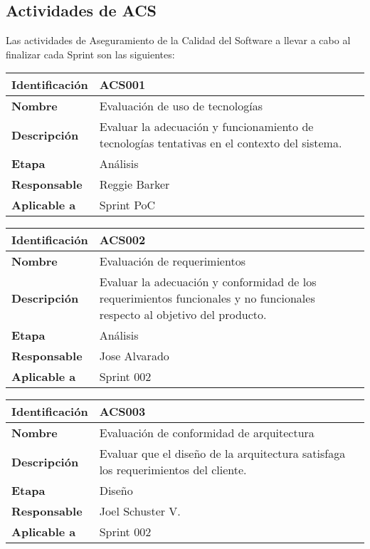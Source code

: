 \documentclass{scrreprt}
\begin{document}
\subsection{Actividades de ACS}

Las actividades de Aseguramiento de la Calidad del Software a llevar a cabo al finalizar cada Sprint son las siguientes:\\

\begin{tabular}{ |p{3cm}|p{10cm}|  }
  \hline
  \textbf{Identificación} & ACS001 \\
  \hline
  \textbf{Nombre} & Evaluación de uso de tecnologías \\
  \hline
  \textbf{Descripción} & Evaluar la adecuación y funcionamiento de tecnologías tentativas en el contexto del sistema. \\
  \hline
  \textbf{Etapa} & Análisis \\
  \hline
  \textbf{Responsable} & Reggie Barker \\
  \hline
  \textbf{Aplicable a} & Sprint PoC \\
  \hline
\end{tabular}

\vspace{0.8cm}

\begin{tabular}{ |p{3cm}|p{10cm}|  }
  \hline
  \textbf{Identificación} & ACS002 \\
  \hline
  \textbf{Nombre} & Evaluación de requerimientos \\
  \hline
  \textbf{Descripción} & Evaluar la adecuación y conformidad de los requerimientos funcionales y no funcionales respecto al objetivo del producto. \\
  \hline
  \textbf{Etapa} & Análisis \\
  \hline
  \textbf{Responsable} & Jose Alvarado \\
  \hline
  \textbf{Aplicable a} & Sprint 002 \\
  \hline
\end{tabular}

\vspace{0.8cm}

\begin{tabular}{ |p{3cm}|p{10cm}|  }
  \hline
  \textbf{Identificación} & ACS003 \\
  \hline
  \textbf{Nombre} & Evaluación de conformidad de arquitectura \\
  \hline
  \textbf{Descripción} & Evaluar que el diseño de la arquitectura satisfaga los requerimientos del cliente. \\
  \hline
  \textbf{Etapa} & Diseño \\
  \hline
  \textbf{Responsable} & Joel Schuster V. \\
  \hline
  \textbf{Aplicable a} & Sprint 002 \\
  \hline
\end{tabular}
\end{document}
